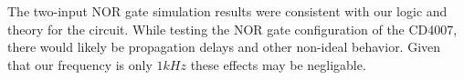 The two-input NOR gate simulation results were consistent with our logic and theory for the circuit. While testing the NOR gate configuration of the CD4007, there would likely be propagation delays and other non-ideal behavior. Given that our frequency is only $1kHz$ these effects may be negligable.
